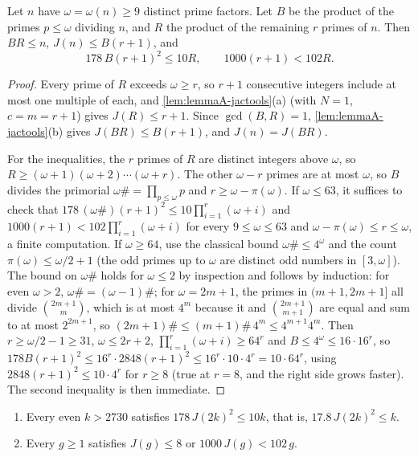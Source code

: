 \begin{lemma}
\label{lem:lemmaA-crude}
Let $n$ have $\omega=\omega(n)\ge9$ distinct prime factors. Let $B$ be the product of the primes $p\le \omega$
dividing $n$, and $R$ the product of the remaining $r$ primes of $n$. Then
$BR\le n$, $J(n)\le B(r+1)$, and
\[
178\,B(r+1)^2\le10R,\qquad1000(r+1)<102R.
\]
\end{lemma}

\begin{proof}
Every prime of $R$ exceeds $\omega\ge r$, so $r+1$ consecutive integers include
at most one multiple of each, and \autoref{lem:lemmaA-jactools}(a) (with
$N=1$, $c=m=r+1$) gives $J(R)\le r+1$. Since $\gcd(B,R)=1$,
\autoref{lem:lemmaA-jactools}(b) gives $J(BR)\le B(r+1)$, and $J(n)=J(BR)$.

For the inequalities, the $r$ primes of $R$ are distinct integers above
$\omega$, so $R\ge(\omega+1)(\omega+2)\cdots(\omega+r)$. The other $\omega-r$ primes are at most
$\omega$, so $B$ divides the primorial $\omega\#=\prod_{p\le \omega}p$ and $r\ge \omega-\pi(\omega)$. If
$\omega\le63$, it suffices to check that
$178\,(\omega\#)(r+1)^2\le10\prod_{i=1}^r(\omega+i)$ and
$1000(r+1)<102\prod_{i=1}^r(\omega+i)$ for every $9\le \omega\le63$ and
$\omega-\pi(\omega)\le r\le \omega$, a finite computation. If $\omega\ge64$, use the classical bound $\omega\#\le4^\omega$ and the
count $\pi(\omega)\le \omega/2+1$ (the odd primes up to $\omega$ are distinct odd numbers
in $[3,\omega]$). The bound on $\omega\#$ holds for $\omega\le2$ by inspection and follows
by induction: for even $\omega>2$, $\omega\#=(\omega-1)\#$; for $\omega=2m+1$, the primes in
$(m+1,2m+1]$ all divide $\binom{2m+1}{m}$, which is at most $4^m$ because it
and $\binom{2m+1}{m+1}$ are equal and sum to at most $2^{2m+1}$, so
$(2m+1)\#\le(m+1)\#\,4^m\le4^{m+1}4^m$. Then $r\ge \omega/2-1\ge31$,
$\omega\le2r+2$, $\prod_{i=1}^r(\omega+i)\ge64^r$ and $B\le4^\omega\le16\cdot16^r$, so
$178B(r+1)^2\le16^r\cdot2848(r+1)^2\le16^r\cdot10\cdot4^r=10\cdot64^r$,
using $2848(r+1)^2\le10\cdot4^r$ for $r\ge8$ (true at $r=8$, and the right
side grows faster). The second inequality is then immediate.
\end{proof}

\begin{corollary}
\label{cor:lemmaA-jac}
\begin{enumerate}
\item[(a)] Every even $k>2730$ satisfies $178\,J(2k)^2\le10k$, that is,
$17.8\,J(2k)^2\le k$.
\item[(b)] Every $g\ge1$ satisfies $J(g)\le8$ or $1000\,J(g)<102\,g$.
\end{enumerate}
\end{corollary}

